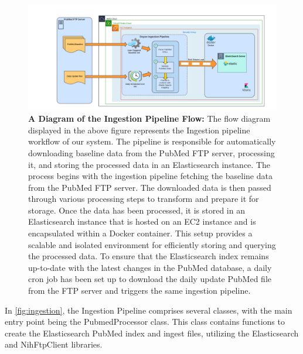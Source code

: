 \begin{figure}[htp]
    \centering
    \includegraphics[width=\textwidth]{Images/Ingestion Pipeline flow.png}
    \caption[A Diagram of the Ingestion Pipeline Flow]{\textbf{A Diagram of the Ingestion Pipeline Flow:} The flow diagram displayed in the above figure represents the Ingestion pipeline workflow of our system. The pipeline is responsible for automatically downloading baseline data from the PubMed FTP server, processing it, and storing the processed data in an Elasticsearch instance. The process begins with the ingestion pipeline fetching the baseline data from the PubMed FTP server. The downloaded data is then passed through various processing steps to transform and prepare it for storage. Once the data has been processed, it is stored in an Elasticsearch instance that is hosted on an EC2 instance and is encapsulated within a Docker container. This setup provides a scalable and isolated environment for efficiently storing and querying the processed data. To ensure that the Elasticsearch index remains up-to-date with the latest changes in the PubMed database, a daily cron job has been set up to download the daily update PubMed file from the FTP server and triggers the same ingestion pipeline. }
    \label{fig:ingestion-flow}
\end{figure}


In \autoref{fig:ingestion}, the Ingestion Pipeline comprises several classes, with the main entry point being the PubmedProcessor class. This class contains functions to create the Elasticsearch PubMed index and ingest files, utilizing the Elasticsearch and NihFtpClient libraries. 

